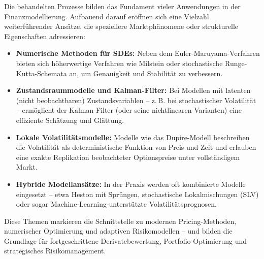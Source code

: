 \documentclass[a4paper,12pt]{article}
\begin{document}
Die behandelten Prozesse bilden das Fundament vieler Anwendungen in der Finanzmodellierung. Aufbauend darauf eröffnen sich eine Vielzahl weiterführender Ansätze, die speziellere Marktphänomene oder strukturelle Eigenschaften adressieren:

\begin{itemize}
  \item \textbf{Numerische Methoden für SDEs:} Neben dem Euler-Maruyama-Verfahren bieten sich höherwertige Verfahren wie Milstein oder stochastische Runge-Kutta-Schemata an, um Genauigkeit und Stabilität zu verbessern.
  
  \item \textbf{Zustandsraummodelle und Kalman-Filter:} Bei Modellen mit latenten (nicht beobachtbaren) Zustandsvariablen – z.\,B. bei stochastischer Volatilität – ermöglicht der Kalman-Filter (oder seine nichtlinearen Varianten) eine effiziente Schätzung und Glättung.
  
  \item \textbf{Lokale Volatilitätsmodelle:} Modelle wie das Dupire-Modell beschreiben die Volatilität als deterministische Funktion von Preis und Zeit und erlauben eine exakte Replikation beobachteter Optionspreise unter vollständigem Markt.
  
  \item \textbf{Hybride Modellansätze:} In der Praxis werden oft kombinierte Modelle eingesetzt – etwa Heston mit Sprüngen, stochastische Lokalmischungen (SLV) oder sogar Machine-Learning-unterstützte Volatilitätsprognosen.
\end{itemize}

Diese Themen markieren die Schnittstelle zu modernen Pricing-Methoden, numerischer Optimierung und adaptiven Risikomodellen – und bilden die Grundlage für fortgeschrittene Derivatebewertung, Portfolio-Optimierung und strategisches Risikomanagement.
\end{document}
